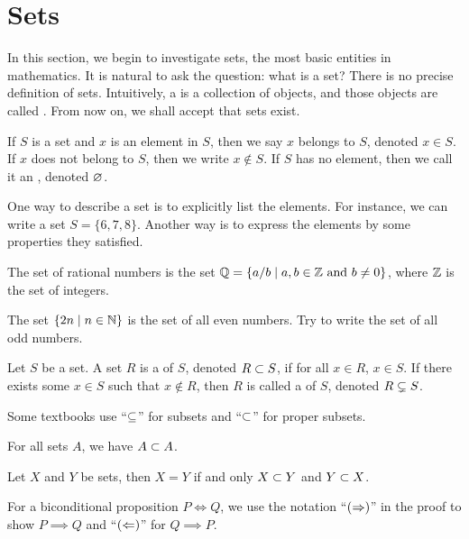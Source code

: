 \documentclass[10pt]{article}
\begin{document}
\section{Sets}
\par
In this section, we begin to investigate sets, the most basic entities in mathematics. It is natural to ask the question: what is a set? There is no precise definition of sets. Intuitively, a  is a collection of objects, and those objects are called . From now on, we shall accept that sets exist.
\par
If $S$ is a set and $x$ is an element in $S$, then we say $x$ belongs to $S$, denoted $x\in S$. If $x$ does not belong to $S$, then we write $x\notin S$. If $S$ has no element, then we call it an , denoted $\varnothing$.
\par
One way to describe a set is to explicitly list the elements. For instance, we can write a set $S=\{6,7,8\}$. Another way is to express the elements by some properties they satisfied.
\begin{example}
    The set of rational numbers is the set $\mathbb{Q}=\{a/b\mid a,b\in\mathbb{Z}\ \text{and}\ b\ne 0\}$, where $\mathbb{Z}$ is the set of integers.
\end{example}
\begin{example}
    The set $\{2n\mid n\in\mathbb{N}\}$ is the set of all even numbers. Try to write the set of all odd numbers.
\end{example}
\begin{definition}
    Let $S$ be a set. A set $R$ is a  of $S$, denoted $R\subset S$, if for all $x\in R$, $x\in S$. If there exists some $x\in S$ such that $x\notin R$, then $R$ is called a  of $S$, denoted $R\subsetneq S$.
\end{definition}
\begin{remark}
    Some textbooks use ``$\subseteq$'' for subsets and ``$\subset$'' for proper subsets.
\end{remark}
\begin{example}
    For all sets $A$, we have $A\subset A$.
\end{example}
\begin{proposition}
    Let $X$ and $Y$ be sets, then $X=Y$ if and only $X\subset Y$ and $Y\subset X$.
\end{proposition}
\begin{remark}
    For a biconditional proposition $P\iff Q$, we use the notation ``$(\Rightarrow)$'' in the proof to show $P\implies Q$ and ``$(\Leftarrow)$'' for $Q\implies P$.
\end{remark}
\end{document}
